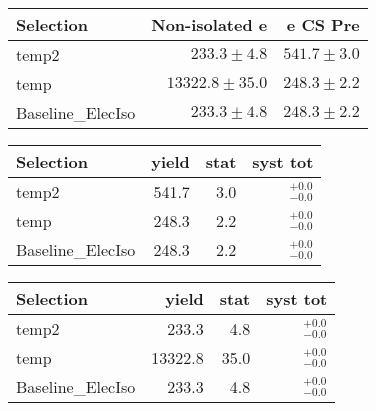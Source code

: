 




\begin{tabular}{lrr}
\toprule
                Selection  &            Non-isolated e  &                         e CS Pre  \\ 
\midrule
                    temp2 &              $233.3\pm4.8$&           $541.7\pm3.0$ \\ 
                     temp &           $13322.8\pm35.0$&           $248.3\pm2.2$ \\ 
        Baseline\_ElecIso &              $233.3\pm4.8$&           $248.3\pm2.2$ \\ 
\bottomrule 
\end{tabular}









\begin{tabular}{l|rrr}
\toprule
           Selection & yield & stat & syst tot   \\ 
\midrule
               temp2 & 541.7 & 3.0 & ${}^{+0.0}_{-0.0}$ \\
                temp & 248.3 & 2.2 & ${}^{+0.0}_{-0.0}$ \\
   Baseline\_ElecIso & 248.3 & 2.2 & ${}^{+0.0}_{-0.0}$ \\
\bottomrule
\end{tabular}



\begin{tabular}{l|rrr}
\toprule
           Selection & yield & stat & syst tot   \\ 
\midrule
               temp2 & 233.3 & 4.8 & ${}^{+0.0}_{-0.0}$ \\
                temp & 13322.8 & 35.0 & ${}^{+0.0}_{-0.0}$ \\
   Baseline\_ElecIso & 233.3 & 4.8 & ${}^{+0.0}_{-0.0}$ \\
\bottomrule
\end{tabular}
